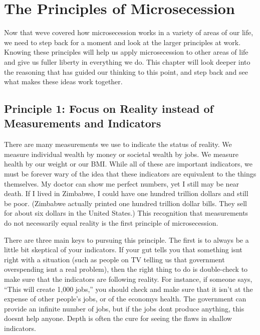 \chapter{The Principles of Microsecession}

Now that we{\textquotesingle}ve covered how microsecession works in a
variety of areas of our life, we need to step back for a moment and
look at the larger principles at work. Knowing these principles will
help us apply microsecession to other areas of life and give us fuller
liberty in everything we do.  This chapter will look deeper into the
reasoning that has guided our thinking to this point, and step back and
see what makes these ideas work together.

\section{Principle 1: Focus on Reality instead of Measurements and Indicators}

There are many measurements we use to indicate the status of reality. We
measure individual wealth by money or societal wealth by jobs. We
measure health by our weight
or our BMI. While all
of these are important indicators, we must be forever wary
of the idea that
these indicators are equivalent to the things themselves. My doctor can
show me perfect numbers, yet I still may be near death. If I lived in
Zimbabwe, I could have one hundred trillion dollars and still be poor.
(Zimbabwe actually printed one hundred trillion dollar bills. They sell
for about six dollars in the United States.)
This recognition that
measurements do not necessarily equal reality is the first principle of
microsecession.

There are three main keys to pursuing this principle. The first is to
always be a little bit skeptical of your indicators. If your gut tells
you that something isn{\textquotesingle}t right with a situation (such
as people on TV telling us that government overspending
isn{\textquotesingle}t a real problem), then the right thing to do is
double-check to make sure that the indicators are following reality.
For instance, if someone says, ``This will create 1,000 jobs,'' you
should check and make sure that it isn't at the
expense of other people’s jobs, or of the economy{\textquotesingle}s
health. The government can provide an infinite number of jobs, but if
the jobs
don{\textquotesingle}t produce anything, this doesn{\textquotesingle}t
help anyone. Depth is often the cure for seeing the flaws in shallow
indicators.

